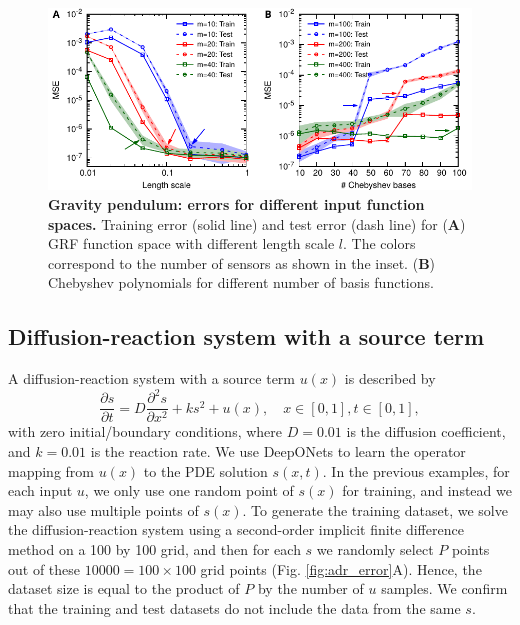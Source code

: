 \documentclass[11pt]{article}
\begin{document}
\begin{figure}[htbp]
\centering
\includegraphics{input.pdf}
\caption{\textbf{Gravity pendulum: errors for different input function spaces.} Training error (solid line) and test error (dash line) for (\textbf{A}) GRF function space with different length scale $l$. The colors correspond to the number of sensors as shown in the inset. (\textbf{B}) Chebyshev polynomials for different number of basis functions.}
\label{fig:input}
\end{figure}

\subsection{Diffusion-reaction system with a source term}

A diffusion-reaction system with a source term $u(x)$ is described by
\begin{equation*}
    \frac{\partial s}{\partial t} = D\frac{\partial^2 s}{\partial x^2} + k s^2 + u(x), \quad x \in [0, 1], t \in [0, 1],
\end{equation*}
with zero initial/boundary conditions, where $D=0.01$ is the diffusion coefficient, and $k=0.01$ is the reaction rate. We use DeepONets to learn the operator mapping from $u(x)$ to the PDE solution $s(x, t)$. In the previous examples, for each input $u$, we only use one random point of $s(x)$ for training, and instead we may also use multiple points of $s(x)$. To generate the training dataset, we solve the diffusion-reaction system using a second-order implicit finite difference method on a 100 by 100 grid, and then for each $s$ we randomly select $P$ points out of these $10000=100 \times 100$ grid points (Fig. \ref{fig:adr_error}A). Hence, the dataset size is equal to the product of $P$ by the number of $u$ samples. We confirm that the training and test datasets do not include the data from  the same $s$.
\end{document}
